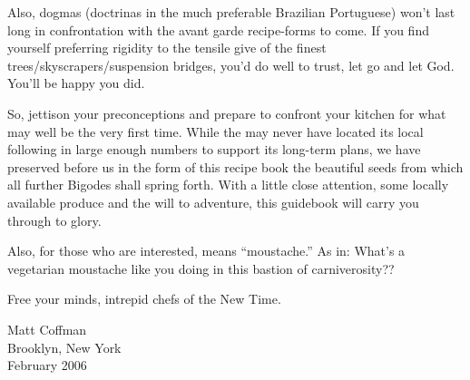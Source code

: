 Also, dogmas (doctrinas in the much preferable Brazilian Portuguese)
won't last long in confrontation with the avant garde recipe-forms to
come.  If you find yourself preferring rigidity to the tensile give of
the finest trees/\-skyscrapers/\-suspension bridges, you'd do well to
trust, let go and let God.  You'll be happy you did.

So, jettison your preconceptions and prepare to confront your kitchen
for what may well be the very first time.  While the  may never
have located its local following in large enough numbers to support
its long-term plans, we have preserved before us in the form of this
recipe book the beautiful seeds from which all further Bigodes shall
spring forth.  With a little close attention, some locally available
produce and the will to adventure, this guidebook will carry you
through to glory.

Also, for those who are interested,  means ``moustache.'' As in:
What's a vegetarian moustache like you doing in this bastion of
carniverosity??

Free your minds, intrepid chefs of the New Time.

\bigskip
\bigskip
\bigskip
\bigskip
\bigskip
Matt Coffman \\ Brooklyn, New York \\ February 2006

